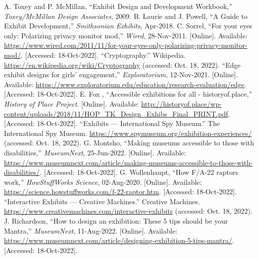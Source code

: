 \documentclass[conference]{IEEEtran}
\begin{document}
\begin{thebibliography}{00}
    \normalsize
   A. Toxey and P. McMillan, “Exhibit Design and Development Workbook,” \textit{Toxey/McMillan Design Associates}, 2009. 
   B. Laurie and J. Powell, “A Guide to Exhibit Development,” \textit{Smithsonian Exhibits}, Apr-2018. 
   C. Sorrel, “For your eyes only: Polarizing privacy monitor mod,” \textit{Wired}, 28-Nov-2011. [Online]. Available: \href{https://www.wired.com/2011/11/for-your-eyes-only-polarizing-privacy-monitor-mod/}{https://www.wired.com/2011/11/for-your-eyes-only-polarizing-privacy-monitor-mod/}. [Accessed: 18-Oct-2022].
   “Cryptography.” Wikipedia. \href{https://en.wikipedia.org/wiki/Cryptography}{https://en.wikipedia.org/wiki/Cryptography}  (accessed: Oct. 18, 2022).
   “Edge exhibit designs for girls' engagement,” \textit{Exploratorium}, 12-Nov-2021. [Online]. Available: \href{https://www.exploratorium.edu/education/research-evaluation/edge}{https://www.exploratorium.edu/education/research-evaluation/edge}. [Accessed: 18-Oct-2022].
   E. Fox , “Accessible exhibitions for all - historyof.place,” \textit{History of Place Project}. [Online]. Available: \href{http://historyof.place/wp-content/uploads/2018/11/HOP\_TK\_Design\_Exhibs\_Final\_PRINT.pdf}{http://historyof.place/wp-content/uploads/2018/11/HOP\_TK\_Design\_Exhibs\_Final\_PRINT.pdf}. [Accessed: 18-Oct-2022].
   “Exhibits — International Spy Museum.” The International Spy Museum.  \href{https://www.spymuseum.org/exhibition-experiences/}{https://www.spymuseum.org/exhibition-experiences/}  (accessed: Oct. 18, 2022).
   G. Montsho, “Making museums accessible to those with disabilities,” \textit{MuseumNext}, 25-Jun-2022. [Online]. Available: \href{https://www.museumnext.com/article/making-museums-accessible-to-those-with-disabilities/}{https://www.museumnext.com/article/making-museums-accessible-to-those-with-disabilities/}. [Accessed: 18-Oct-2022].
   G. Wollenhaupt, “How F/A-22 raptors work,” \textit{HowStuffWorks Science}, 02-Aug-2020. [Online]. Available: \href{https://science.howstuffworks.com/f-22-raptor.htm}{https://science.howstuffworks.com/f-22-raptor.htm}. [Accessed: 18-Oct-2022]. 
 “Interactive Exhibits — Creative Machines.” Creative Machines.  \href{https://www.creativemachines.com/interactive-exhibits}{https://www.creativemachines.com/interactive-exhibits}  (accessed: Oct. 18, 2022).
 J. Richardson, “How to design an exhibition: These 5 tips should be your Mantra,” \textit{MuseumNext}, 11-Aug-2022. [Online]. Available: \href{https://www.museumnext.com/article/designing-exhibition-5-tips-mantra/}{https://www.museumnext.com/article/designing-exhibition-5-tips-mantra/}. [Accessed: 18-Oct-2022].

\end{thebibliography}
\end{document}
